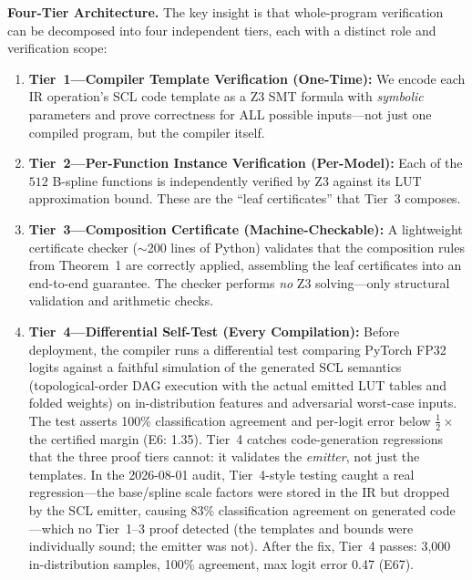 \documentclass[journal,onecolumn]{IEEEtran}
\begin{document}
\vspace{4pt}
\noindent\textbf{Four-Tier Architecture.}
The key insight is that whole-program verification can be decomposed into
four independent tiers, each with a distinct role and verification scope:
\begin{enumerate}
    \item \textbf{Tier~1---Compiler Template Verification (One-Time):}
         We encode each IR operation's SCL code template as a Z3 SMT formula
         with \textit{symbolic} parameters and prove correctness for ALL
         possible inputs---not just one compiled program, but the compiler itself.
    \item \textbf{Tier~2---Per-Function Instance Verification (Per-Model):}
         Each of the $512$ B-spline functions is independently verified by Z3
         against its LUT approximation bound. These are the ``leaf
         certificates'' that Tier~3 composes.
    \item \textbf{Tier~3---Composition Certificate (Machine-Checkable):}
         A lightweight certificate checker ($\sim$200 lines of Python)
         validates that the composition rules from Theorem~1 are correctly
         applied, assembling the leaf certificates into an end-to-end
         guarantee. The checker performs \textit{no} Z3 solving---only
         structural validation and arithmetic checks.
    \item \textbf{Tier~4---Differential Self-Test (Every Compilation):}
         Before deployment, the compiler runs a differential test comparing
         PyTorch FP32 logits against a faithful simulation of the generated
         SCL semantics (topological-order DAG execution with the actual
         emitted LUT tables and folded weights) on in-distribution features
         and adversarial worst-case inputs. The test asserts 100\%
         classification agreement and per-logit error below
         $\frac{1}{2} \times$ the certified margin (E6: 1.35). Tier~4
         catches code-generation regressions that the three proof tiers
         cannot: it validates the \emph{emitter}, not just the templates.
         In the 2026-08-01 audit, Tier~4-style testing caught a real
         regression---the base/spline scale factors were stored in the IR
         but dropped by the SCL emitter, causing 83\% classification
         agreement on generated code---which no Tier~1--3 proof detected
         (the templates and bounds were individually sound; the emitter
         was not). After the fix, Tier~4 passes: 3{,}000 in-distribution
         samples, 100\% agreement, max logit error 0.47 (E67).


\end{enumerate}
\end{document}
